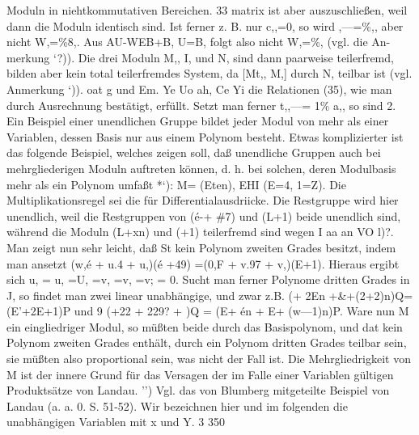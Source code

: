 \documentclass[11pt,a4paper]{article}
\theoremstyle{plain}
\theoremstyle{definition}
\begin{document}
Moduln in niehtkommutativen Bereichen. 
33 
matrix ist aber auszuschließen, weil dann die Moduln identisch sind. 
Ist 
ferner 
z. B. nur c,,=0, 
so wird ,---=\%,, 
aber nicht W,=\%8,. 
Aus 
AU-WEB+B, U=B, 
folgt also 
nicht W,=\%, (vgl. die An- 
merkung `?)). 
Die drei Moduln M,, I, und N, sind dann paarweise 
teilerfremd, 
bilden 
aber kein 
total teilerfremdes System, 
da [Mt,, M,] 
durch N, teilbar ist (vgl. Anmerkung `\textdegree{})). 
oat g und Em. 
Ye 
Uo 
ah, Ce Yi 
die Relationen (35), wie man durch Ausrechnung bestätigt, erfüllt. 
Setzt man 
ferner 
t,,---= 1\% 
a,, 
so sind 
2. Ein Beispiel einer unendlichen Gruppe bildet jeder Modul von mehr 
als einer Variablen, dessen Basis nur aus einem Polynom besteht. 
Etwas 
komplizierter ist das folgende Beispiel, welches zeigen soll, daß unendliche 
Gruppen auch 
bei mehrgliederigen Moduln auftreten können, 
d. h. bei 
solchen, deren Modulbasis mehr als ein Polynom umfaßt \textdegree{}*`): 
M= (Eten), EHI 
(E=4, 1=Z). 
Die Multiplikationsregel sei die für Differentialausdriicke. 
Die Restgruppe 
wird hier unendlich, weil die Restgruppen von (é-+ \#7) und (L+1) beide 
unendlich 
sind, während 
die Moduln (L+xn) und (+1) teilerfremd 
sind wegen 
I 
aa 
an VO 
l)?. 
Man zeigt nun sehr leicht, daß St kein Polynom zweiten Grades besitzt, 
indem man ansetzt (w,é + u.4 + u,)(é +49) =(0,F + v.97 + v,)(E+1). 
Hieraus 
ergibt sich u, = u, 
=U, =v, 
=v, 
=v; = 0. 
Sucht man ferner 
Polynome 
dritten Grades 
in J, so findet man zwei linear unabhängige, 
und zwar z.B. 
(+ 2En 
+\&+(2+2)n)Q=(E'+2E+1)P 
und 
9 
(+22 
+ 229? + )Q = (E+ én + E+ (w---1)n)P. 
Ware 
nun M ein eingliedriger Modul, 
so müßten beide durch das 
Basispolynom, und dat kein Polynom zweiten Grades enthält, durch ein 
Polynom 
dritten Grades 
teilbar 
sein, 
sie müßten also proportional sein, 
was nicht der Fall ist. 
Die Mehrgliedrigkeit von M ist der innere Grund 
für das Versagen der im Falle einer Variablen gültigen Produktsätze von 
Landau. 
'') Vgl. das von Blumberg mitgeteilte Beispiel von Landau (a. a. 0. S. 51-52). 
Wir bezeichnen hier und im folgenden die unabhängigen Variablen mit x und Y. 
3 
350
\end{document}
